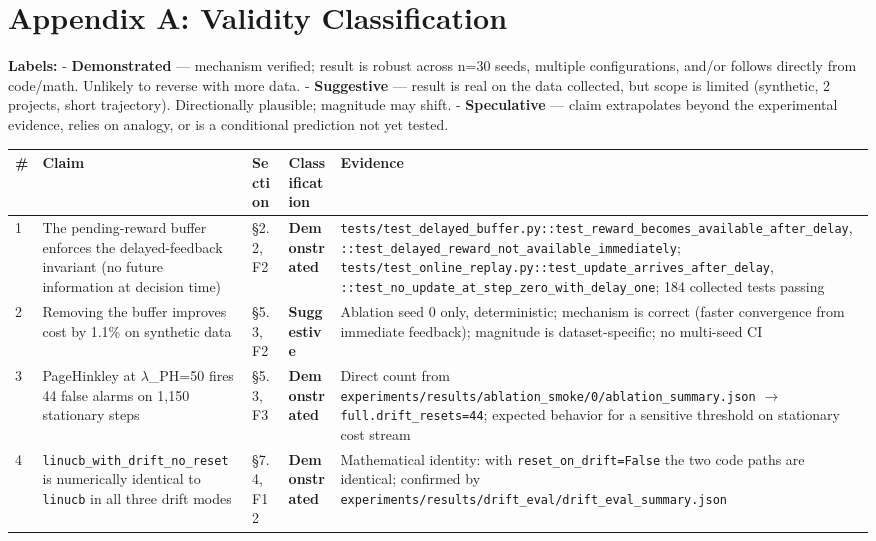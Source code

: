 \documentclass[10pt]{article}
\begin{document}
\section{Appendix A: Validity
Classification}\label{appendix-a-validity-classification}

\textbf{Labels:} - \textbf{Demonstrated} --- mechanism verified; result
is robust across n=30 seeds, multiple configurations, and/or follows
directly from code/math. Unlikely to reverse with more data. -
\textbf{Suggestive} --- result is real on the data collected, but scope
is limited (synthetic, 2 projects, short trajectory). Directionally
plausible; magnitude may shift. - \textbf{Speculative} --- claim
extrapolates beyond the experimental evidence, relies on analogy, or is
a conditional prediction not yet tested.

\begin{table}[ht]\centering\begin{tabular}{lllll}
\toprule\noalign{}
\#
 & Claim
 & Section
 & Classification
 & Evidence
 \\
\midrule\noalign{}
\bottomrule\noalign{}
1 & The pending-reward buffer enforces the delayed-feedback invariant
(no future information at decision time) & §2.2, F2 &
\textbf{Demonstrated} &
\texttt{tests/test\_delayed\_buffer.py::test\_reward\_becomes\_available\_after\_delay},
\texttt{::test\_delayed\_reward\_not\_available\_immediately};
\texttt{tests/test\_online\_replay.py::test\_update\_arrives\_after\_delay},
\texttt{::test\_no\_update\_at\_step\_zero\_with\_delay\_one}; 184
collected tests passing \\
2 & Removing the buffer improves cost by 1.1\% on synthetic data & §5.3,
F2 & \textbf{Suggestive} & Ablation seed 0 only, deterministic;
mechanism is correct (faster convergence from immediate feedback);
magnitude is dataset-specific; no multi-seed CI \\
3 & PageHinkley at $\lambda$\_PH=50 fires 44 false alarms on 1,150 stationary
steps & §5.3, F3 & \textbf{Demonstrated} & Direct count from
\texttt{experiments/results/ablation\_smoke/0/ablation\_summary.json} $\rightarrow$
\texttt{full.drift\_resets=44}; expected behavior for a sensitive
threshold on stationary cost stream \\
4 & \texttt{linucb\_with\_drift\_no\_reset} is numerically identical to
\texttt{linucb} in all three drift modes & §7.4, F12 &
\textbf{Demonstrated} & Mathematical identity: with
\texttt{reset\_on\_drift=False} the two code paths are identical;
confirmed by
\texttt{experiments/results/drift\_eval/drift\_eval\_summary.json}

\end{tabular}
\end{table}
\end{document}
